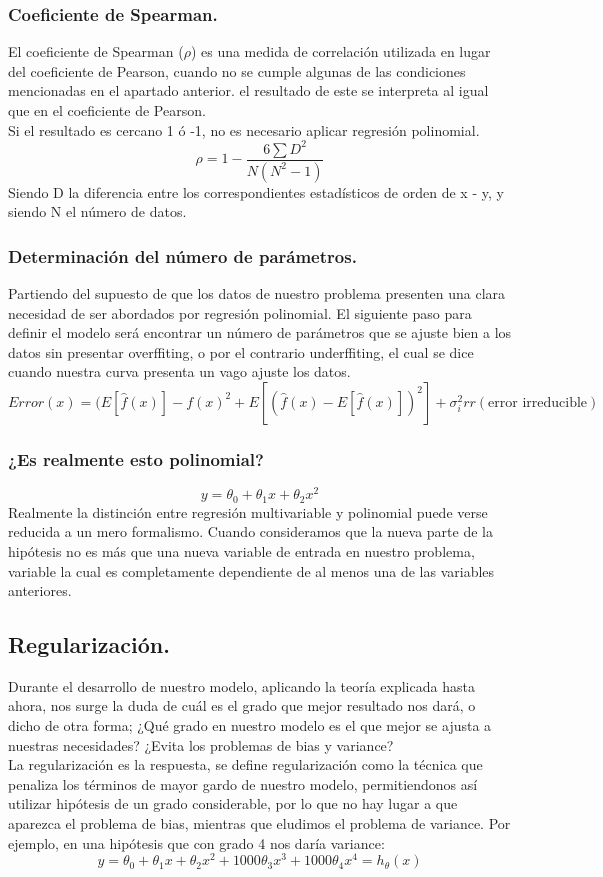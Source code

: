 \documentclass[a4paper,10pt]{article}
\begin{document}
\subsubsection{Coeficiente de Spearman.}

El coeficiente de Spearman ($\rho$) es una medida de correlación utilizada en lugar del coeficiente de Pearson, cuando no se cumple algunas de las condiciones mencionadas en el apartado anterior. el resultado de este se interpreta al igual que en el coeficiente de Pearson. \\Si el resultado es cercano 1 ó -1, no es necesario aplicar regresión polinomial.
\[
\rho = 1 - \frac{6\sum D^2}{N(N^2 - 1)}
\]
Siendo D la diferencia entre los correspondientes estadísticos de orden de x - y, y siendo N el número de datos.
\subsubsection{Determinación del número de parámetros.}

Partiendo del supuesto de que los datos de nuestro problema presenten una clara necesidad de ser abordados por regresión polinomial. El siguiente paso para definir el modelo será encontrar un número de parámetros que se ajuste bien a los datos sin presentar overffiting, o por el contrario underffiting, el cual se dice cuando nuestra curva presenta un vago ajuste los datos. 
\[
Error (x) = (E[\hat{f}(x)]-f(x)^2+E[(\hat{f}(x)-E[\hat{f}(x)])^2]+\sigma^2_irr (\text{error irreducible})
\]
\subsubsection{¿Es realmente esto polinomial?}

\[
y=\theta_0+\theta_{1}x+\theta_{2}x^2
\]
Realmente la distinción entre regresión multivariable y polinomial puede verse reducida a un mero formalismo. Cuando consideramos que la nueva parte de la hipótesis no es más que una nueva variable de entrada en nuestro problema, variable la cual es completamente dependiente de al menos una de las variables anteriores.
\subsection{Regularización.}
\noindent
Durante el desarrollo de nuestro modelo, aplicando la teoría explicada hasta ahora, nos surge la duda de cuál es el grado que mejor resultado nos dará, o dicho de otra forma; ¿Qué grado en nuestro modelo es el que mejor se ajusta a nuestras necesidades? ¿Evita los problemas de bias y variance?\\
La regularización es la respuesta, se define regularización como la técnica que penaliza los términos de mayor gardo de nuestro modelo, permitiendonos así utilizar hipótesis de un grado considerable, por lo que no hay lugar a que aparezca el problema de bias, mientras que eludimos el problema de variance. Por ejemplo, en una hipótesis que con grado 4 nos daría variance:
\[
 y=\theta_0+\theta_1 x+\theta_2 x^2+1000\theta_3 x^3+1000\theta_4 x^4 = h_\theta (x)
\]
\end{document}

